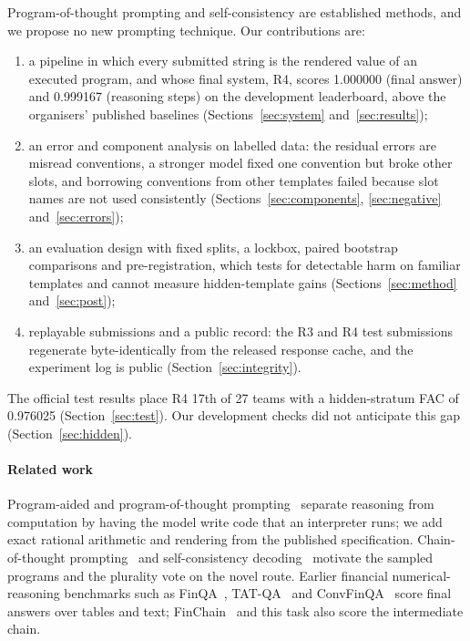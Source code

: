 \documentclass[conference]{IEEEtran}
\begin{document}
Program-of-thought prompting and self-consistency are established methods, and we propose no new prompting technique. Our contributions are:
\begin{enumerate}
\item a pipeline in which every submitted string is the rendered value of an executed program, and whose final system, R4, scores 1.000000 (final answer) and 0.999167 (reasoning steps) on the development leaderboard, above the organisers' published baselines (Sections~\ref{sec:system} and~\ref{sec:results});
\item an error and component analysis on labelled data: the residual errors are misread conventions, a stronger model fixed one convention but broke other slots, and borrowing conventions from other templates failed because slot names are not used consistently (Sections~\ref{sec:components}, \ref{sec:negative} and~\ref{sec:errors});
\item an evaluation design with fixed splits, a lockbox, paired bootstrap comparisons and pre-registration, which tests for detectable harm on familiar templates and cannot measure hidden-template gains (Sections~\ref{sec:method} and~\ref{sec:post});
\item replayable submissions and a public record: the R3 and R4 test submissions regenerate byte-identically from the released response cache, and the experiment log is public (Section~\ref{sec:integrity}).
\end{enumerate}
The official test results place R4 17th of 27 teams with a hidden-stratum FAC of 0.976025 (Section~\ref{sec:test}). Our development checks did not anticipate this gap (Section~\ref{sec:hidden}).

\paragraph*{Related work}
Program-aided and program-of-thought prompting~\cite{gao2023palprogramaidedlanguagemodels,chen2023programthoughtspromptingdisentangling} separate reasoning from computation by having the model write code that an interpreter runs; we add exact rational arithmetic and rendering from the published specification. Chain-of-thought prompting~\cite{NEURIPS2022_9d560961} and self-consistency decoding~\cite{wang2023selfconsistencyimproveschainthought} motivate the sampled programs and the plurality vote on the novel route. Earlier financial numerical-reasoning benchmarks such as FinQA~\cite{chen-etal-2021-finqa}, TAT-QA~\cite{zhu-etal-2021-tat} and ConvFinQA~\cite{chen-etal-2022-convfinqa} score final answers over tables and text; FinChain~\cite{xie-etal-2026-finchain} and this task also score the intermediate chain.
\end{document}
